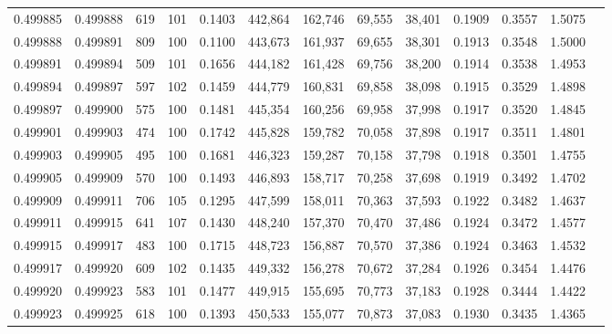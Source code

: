 \begin{tabular}{rrrrrrrrrrrrr}
0.499885 & 0.499888 &   619 & 101 &                                     0.1403 & 442,864 & 162,746 &  69,555 &  38,401 & 0.1909 & 0.3557 & 1.5075 \\
0.499888 & 0.499891 &   809 & 100 &                                     0.1100 & 443,673 & 161,937 &  69,655 &  38,301 & 0.1913 & 0.3548 & 1.5000 \\
0.499891 & 0.499894 &   509 & 101 &                                     0.1656 & 444,182 & 161,428 &  69,756 &  38,200 & 0.1914 & 0.3538 & 1.4953 \\
0.499894 & 0.499897 &   597 & 102 &                                     0.1459 & 444,779 & 160,831 &  69,858 &  38,098 & 0.1915 & 0.3529 & 1.4898 \\
0.499897 & 0.499900 &   575 & 100 &                                     0.1481 & 445,354 & 160,256 &  69,958 &  37,998 & 0.1917 & 0.3520 & 1.4845 \\
0.499901 & 0.499903 &   474 & 100 &                                     0.1742 & 445,828 & 159,782 &  70,058 &  37,898 & 0.1917 & 0.3511 & 1.4801 \\
0.499903 & 0.499905 &   495 & 100 &                                     0.1681 & 446,323 & 159,287 &  70,158 &  37,798 & 0.1918 & 0.3501 & 1.4755 \\
0.499905 & 0.499909 &   570 & 100 &                                     0.1493 & 446,893 & 158,717 &  70,258 &  37,698 & 0.1919 & 0.3492 & 1.4702 \\
0.499909 & 0.499911 &   706 & 105 &                                     0.1295 & 447,599 & 158,011 &  70,363 &  37,593 & 0.1922 & 0.3482 & 1.4637 \\
0.499911 & 0.499915 &   641 & 107 &                                     0.1430 & 448,240 & 157,370 &  70,470 &  37,486 & 0.1924 & 0.3472 & 1.4577 \\
0.499915 & 0.499917 &   483 & 100 &                                     0.1715 & 448,723 & 156,887 &  70,570 &  37,386 & 0.1924 & 0.3463 & 1.4532 \\
0.499917 & 0.499920 &   609 & 102 &                                     0.1435 & 449,332 & 156,278 &  70,672 &  37,284 & 0.1926 & 0.3454 & 1.4476 \\
0.499920 & 0.499923 &   583 & 101 &                                     0.1477 & 449,915 & 155,695 &  70,773 &  37,183 & 0.1928 & 0.3444 & 1.4422 \\
0.499923 & 0.499925 &   618 & 100 &                                     0.1393 & 450,533 & 155,077 &  70,873 &  37,083 & 0.1930 & 0.3435 & 1.4365 \\

\end{tabular}
